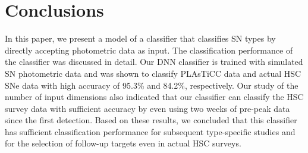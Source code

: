 \documentclass[useamsfonts]{pasj01}
\begin{document}
\section{Conclusions}
%
In this paper, we present a model of a classifier that classifies SN types by directly accepting photometric data as input. The classification performance of the classifier was discussed in detail.
Our DNN classifier is trained with simulated SN photometric data and was shown to classify PLAsTiCC data and actual HSC SNe data with high accuracy of 95.3\% and 84.2\%, respectively.
Our study of the number of input dimensions also indicated that our classifier can classify the HSC survey data with sufficient accuracy by even using two weeks of pre-peak data since the first detection.
Based on these results, we concluded that this classifier has sufficient classification performance for subsequent type-specific studies and for the selection of follow-up targets even in actual HSC surveys.
%
\end{document}
